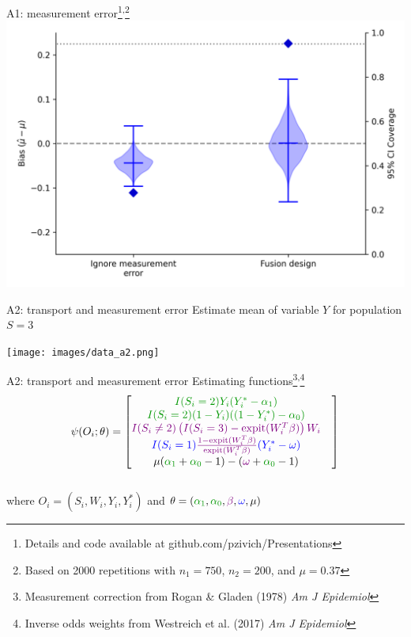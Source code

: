 \documentclass{beamer}
\newcommand{\blue}[1]{\textcolor{blue}{#1}}
\newcommand{\violet}[1]{\textcolor{violet}{#1}}
\newcommand{\green}[1]{\textcolor{ForestGreen}{#1}}
\begin{document}
\begin{frame}{A1: measurement error\footnote[frame]{Details and code available at github.com/pzivich/Presentations}\textsuperscript{,}\footnote[frame]{Based on 2000 repetitions with $n_1=750$, $n_2=200$, and $\mu=0.37$}}
	\centering 
	\includegraphics[scale=0.55]{images/sim_a1_results.png}
\end{frame}

\begin{frame}{A2: transport and measurement error}
	Estimate mean of variable $Y$ for population $S=3$
	\begin{center}
		\texttt{[image: images/data\_a2.png]}
	\end{center}
\end{frame}

\begin{frame}{A2: transport and measurement error}
	Estimating functions\footnote[frame]{Measurement correction from Rogan \& Gladen (1978) \textit{Am J Epidemiol}}\textsuperscript{,}\footnote[frame]{Inverse odds weights from Westreich et al. (2017) \textit{Am J Epidemiol}}
	\[\psi(O_i; \theta) = 
	\begin{bmatrix}
		\green{I(S_i = 2) Y_i (Y_i^* - \alpha_1)} & \\
		\green{I(S_i = 2) (1-Y_i) (\left(1-Y_i^*) - \alpha_0\right)} & \\
		\violet{I(S_i \ne 2) \left( I(S_i=3) - \text{expit}(W_i^T\beta) \right) W_i} & \\
		\blue{I(S_i = 1)} \violet{\frac{1 - \text{expit}(W_i^T \beta)}{\text{expit}(W_i^T \beta)}} \blue{(Y_i^* - \omega)} & \\
		\mu(\green{\alpha_1} + \green{\alpha_0} - 1) - (\violet{\omega} + \green{\alpha_0} - 1)		
	\end{bmatrix}\]~\\
	where $O_i = (S_i, W_i, Y_i, Y_i^*)$ and $\theta = (\green{\alpha_1}, \green{\alpha_0}, \violet{\beta}, \blue{\omega}, \mu)$
\end{frame}
\end{document}
